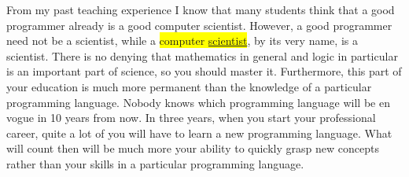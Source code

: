 
From my past teaching experience I know that many students think that a good programmer already is a
good computer scientist.  However, a good programmer need not be a scientist, while a 
\colorbox{yellow}{computer \underline{scientist}}, by its very name, is a
\colorbox{amethyst}{scientist}.  There is no denying that mathematics in general and 
logic in particular is an important part of science, so you should master it.  Furthermore, this
part of your education is much more permanent than the knowledge of a particular programming
language.  Nobody knows which programming language will be en vogue in 10 years from now.  In three
years, when you start your professional career, quite a lot of you will have to learn a new
programming language.  What will count then will be much more your ability to quickly grasp new
concepts rather than your skills in a particular programming language.

